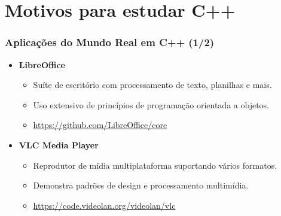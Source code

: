\documentclass[aspectratio=169]{beamer}
\begin{document}
\section{Motivos para estudar C++}

\begin{frame}
    \frametitle{Aplicações do Mundo Real em C++ (1/2)}

    \begin{itemize}
        \item \textbf{LibreOffice}
        \begin{itemize}
            \item Suíte de escritório com processamento de texto, planilhas e mais.
            \item Uso extensivo de princípios de programação orientada a objetos.
            \item \href{https://github.com/LibreOffice/core}{https://github.com/LibreOffice/core}
        \end{itemize}

        \item \textbf{VLC Media Player}
        \begin{itemize}
            \item Reprodutor de mídia multiplataforma suportando vários formatos.
            \item Demonstra padrões de design e processamento multimídia.
            \item \href{https://code.videolan.org/videolan/vlc}{https://code.videolan.org/videolan/vlc}
        \end{itemize}
    \end{itemize}
\end{frame}
\end{document}
